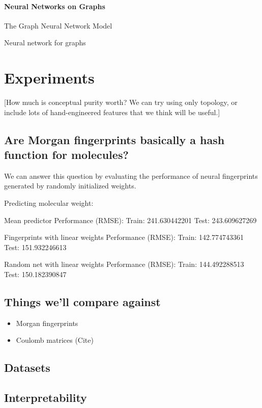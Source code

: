 \documentclass{article}
\begin{document}
\paragraph{Neural Networks on Graphs}

\citet{graphnn2009} The Graph Neural Network Model

\citet{micheli2009neural} Neural network for graphs



\section{Experiments}

[How much is conceptual purity worth?  We can try using only topology, or include lots of hand-engineered features that we think will be useful.]

\subsection{Are Morgan fingerprints basically a hash function for molecules?}

We can answer this question by evaluating the performance of neural fingerprints generated by randomly initialized weights.


Predicting molecular weight:

Mean predictor
Performance (RMSE):
Train: 241.630442201
Test:  243.609627269

Fingerprints with linear weights
Performance (RMSE):
Train: 142.774743361
Test:  151.932246613

Random net with linear weights
Performance (RMSE):
Train: 144.492288513
Test:  150.182390847

\subsection{Things we'll compare against}

\begin{itemize}
\item Morgan fingerprints
\item Coulomb matrices (Cite)
\end{itemize}

\subsection{Datasets}

\subsection{Interpretability}
\end{document}
